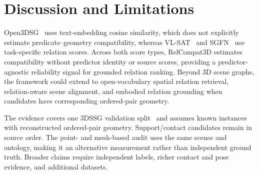 \section{Discussion and Limitations}

Open3DSG~\cite{koch2024open3dsg} uses text-embedding cosine similarity, which does not explicitly estimate predicate--geometry compatibility, whereas VL-SAT~\cite{wang2023vl} and SGFN~\cite{wu2021scenegraphfusion} use task-specific relation scores. Across both score types, RelCompat3D estimates compatibility without predictor identity or source scores, providing a predictor-agnostic reliability signal for grounded relation ranking. Beyond 3D scene graphs, the framework could extend to open-vocabulary spatial relation retrieval, relation-aware scene alignment, and embodied relation grounding when candidates have corresponding ordered-pair geometry.

The evidence covers one 3DSSG validation split~\cite{wald2020learning} and assumes known instances with reconstructed ordered-pair geometry. Support/contact candidates remain in source order. The point- and mesh-based audit uses the same scenes and ontology, making it an alternative measurement rather than independent ground truth. Broader claims require independent labels, richer contact and pose evidence, and additional datasets.
